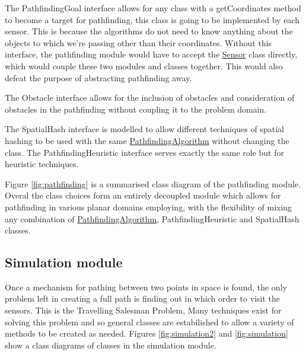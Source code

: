 \documentclass[10pt,a4paper]{article}
\begin{document}
\par 
The PathfindingGoal interface allows for any class with a getCoordinates method to become a target for pathfinding, this class is going to be implemented by each sensor. This is because the algorithms do not need to know anything about the objects to which we're passing other than their coordinates.
Without this interface, the pathfinding module would have to accept the \hyperref[tab:Sensor]{\color{blue}Sensor} class directly, which would couple these two modules and classes together. This would also defeat the purpose of abstracting pathfinding away.
\par
The Obstacle interface allows for the inclusion of obstacles and consideration of obstacles in the pathfinding without coupling it to the problem domain.
\par 
The SpatialHash interface is modelled to allow different techniques of spatial hashing to be used with the same \hyperref[tab:PathfindingAlgorithm]{\color{blue}PathfindingAlgorithm} without changing the class.
The PathfindingHeuristic interface serves exactly the same role but for heuristic techniques.
\par
Figure \ref{fig:pathfinding} is a summarised class diagram of the pathfinding module. Overal the class choices form an entirely decoupled module which allows for pathfinding in various planar domains employing,
with the flexibility of mixing any combination of \hyperref[tab:PathfindingAlgorithm]{\color{blue}PathfindingAlgorithm}, PathfindingHeuristic and SpatialHash classes.


\subsection{Simulation module}
Once a mechanism for pathing between two points in space is found, the only problem left in creating a full path is finding out in which order to visit the sensors. This is the Travelling Salesman Problem,
Many techniques exist for solving this problem and so general classes are estabilished to allow a variety of methods to be created as needed.
Figures \ref{fig:simulation2} and \ref{fig:simulation} show a class diagrams of classes in the simulation module.
\end{document}
